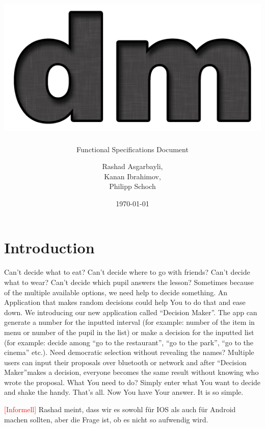 \documentclass[hidelinks, a4paper, 11pt]{scrartcl}
\author{Rashad Asgarbayli,\\ Kanan Ibrahimov,\\ Philipp Schoch}
\title{\vspace{3cm}\includegraphics[scale=0.7]{Logo.png}\\ \app\vspace{20mm}}
\subtitle{Functional Specifications Document}
\date{\today}
\def\app{``Decision Maker''}
\begin{document}
\maketitle
\thispagestyle{empty}

\newpage

\tableofcontents

\newpage


\section{Introduction}

\paragraph{}Can't decide what to eat? Can't decide where to go with friends? Can't decide what to wear? Can't decide which pupil answers the lesson? Sometimes because of the multiple available options, we need help to decide something. An Application that makes random decisions could help You to do that and ease down. We introducing our new application called \app. The app can generate a number for the inputted interval (for example: number of the item in menu or number of the pupil in the list) or make a decision for the inputted list (for example: decide among ``go to the restaurant'', ``go to the park'', ``go to the cinema'' etc.). Need democratic selection without revealing the names? Multiple users can input their proposals over bluetooth or network and after \app makes a decision, everyone becomes the same result without knowing who wrote the proposal. What You need to do? Simply enter what You want to decide and shake the handy. That's all. Now You have Your answer. It is so simple.







\textcolor{red}{[Informell]} Rashad meint, dass wir es sowohl für IOS als auch für Android machen sollten, aber die Frage ist, ob es nicht so aufwendig wird. 

















\end{document}
